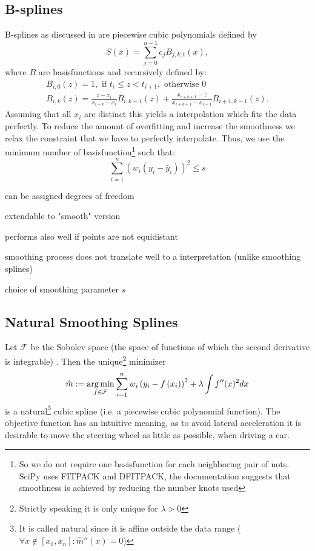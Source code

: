 	\subsection{B-splines}
		\label{sec:B}
		B-splines as discussed in \cite{lycheSplineMethods2005} are piecewise cubic polynomials defined by 
		$$
			S(x)=\sum_{j=0}^{n-1} c_{j} B_{j, k ; t}(x),
		$$
		where $B$ are basisfunctions and recursively defined by:
		$$
			\begin{array}{r}
				B_{i, 0}(z)=1, \text { if } t_{i} \leq z<t_{i+1}, \text { otherwise } 0 \\
				B_{i, k}(z)=\frac{z-x_{i}}{x_{i+k}-x_{i}} B_{i, k-1}(z)+\frac{x_{i+k+1}-z}{x_{i+k+1}-x_{i+1}} B_{i+1, k-1}(z).
			\end{array}
		$$
		Assuming that all $x_i$ are distinct this yields a interpolation which fits the data perfectly. To reduce the amount of overfitting and increase the smoothness we relax the constraint that we have to perfectly interpolate. Thus, we use the minimum number of basisfunction\footnote{So we do not require one basisfunction for each neighboring pair of nots. SciPy uses FITPACK and DFITPACK, the documentation suggests that smoothness is achieved by reducing the number knots used} such that:
		$$\sum_{i=1}^n(w_i (y_i - \hat y_i))^2 \leq s$$

		\begin{my_pros_cons_table}{
				\item can be assigned degrees of freedom
				\item extendable to "smooth" version
				\item performs also well if points are not equidistant
			}{
				\item smoothing process does not translate well to a interpretation (unlike smoothing splines)
				\item choice of smoothing parameter $s$
			}
		\end{my_pros_cons_table}


	\subsection{Natural Smoothing Splines}
		\label{sec:Natural_SS}
		Let $\mathcal F$ be the Sobolev space (the space of functions of which the second derivative is integrable) . Then the unique\footnote{Strictly speaking it is only unique for $\lambda > 0$} minimizer
		$$
			\hat m :=\operatorname*{arg\, min}_{f \in \mathcal F} \sum_{i=1}^{n}w_i\left(y_{i}-{f}\left(x_{i}\right)\right)^{2}+\lambda \int {f}^{\prime \prime}(x)^{2} dx
		$$
		is a natural\footnote{It is called natural since it is affine outside the data range ($\forall x\notin [x_1, x_n]:\hat m''(x) = 0$)} cubic spline (i.e. a piecewise cubic polynomial function).
		The objective function has an intuitive meaning, as to avoid lateral acceleration it is desirable to move the steering wheel as little as possible, when driving a car.


